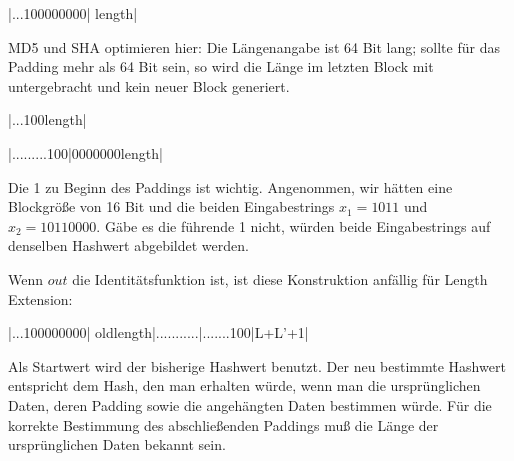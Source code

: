 |...100000000|       length|

MD5 und SHA optimieren hier: Die Längenangabe ist 64 Bit lang; sollte für das Padding mehr als 64 Bit sein, so wird die Länge im letzten Block mit untergebracht und kein neuer Block generiert.

|...100length|

|.........100|0000000length|

Die 1 zu Beginn des Paddings ist wichtig. Angenommen, wir hätten eine Blockgröße von 16 Bit und die beiden Eingabestrings $x_1 = 1011$ und $x_2 = 10110000$. Gäbe es die führende 1 nicht, würden beide Eingabestrings auf denselben Hashwert abgebildet werden.

Wenn $out$ die Identitätsfunktion ist, ist diese Konstruktion anfällig für Length Extension:

|...100000000|    oldlength|...........|.......100|L+L'+1|

Als Startwert wird der bisherige Hashwert benutzt. Der neu bestimmte Hashwert entspricht dem Hash, den man erhalten würde, wenn man die ursprünglichen Daten, deren Padding sowie die angehängten Daten bestimmen würde. Für die korrekte Bestimmung des abschließenden Paddings muß die Länge der ursprünglichen Daten bekannt sein.

